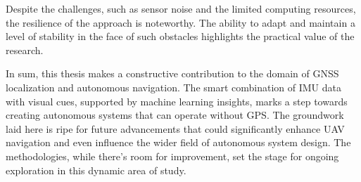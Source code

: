Despite the challenges, such as sensor noise and the limited computing resources, the resilience of the approach is noteworthy. The ability to adapt and maintain a level of stability in the face of such obstacles highlights the practical value of the research.

In sum, this thesis makes a constructive contribution to the domain of GNSS localization and autonomous navigation. The smart combination of IMU data with visual cues, supported by machine learning insights, marks a step towards creating autonomous systems that can operate without GPS. The groundwork laid here is ripe for future advancements that could significantly enhance UAV navigation and even influence the wider field of autonomous system design. The methodologies, while there's room for improvement, set the stage for ongoing exploration in this dynamic area of study.